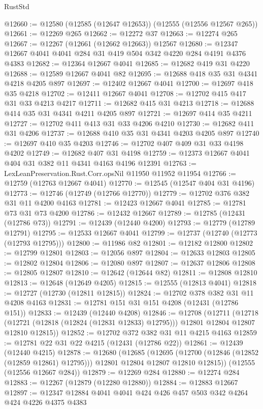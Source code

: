 \begin{lexlean}{RustStd}
\begin{coremodule}
@12660 := @12580 (@12585 (@12647 @12653)) (@12555 (@12556 @12567 @265))
@12661 := @12269 @265
@12662 := @12272 @37
@12663 := @12274 @265
@12667 := @12267 (@12661 (@12662 @12663)) @12567
@12680 := @12347 @12667 @4041 @4041 @284 @31 @419 @504 @342 @4220 @284 @4191 @4376 @4383
@12682 := @12364 @12667 @4041
@12685 := @12682 @419 @31 @4220
@12688 := @12589 @12667 @4041 @82
@12695 := @12688 @418 @35 @31 @4341 @4218 @4205 @897
@12697 := @12402 @12667 @4041
@12700 := @12697 @418 @35 @4218
@12702 := @12411 @12667 @4041
@12708 := @12702 @415 @417 @31 @33 @4213 @4217
@12711 := @12682 @415 @31 @4213
@12718 := @12688 @414 @35 @31 @4341 @4211 @4205 @897
@12721 := @12697 @414 @35 @4211
@12727 := @12702 @411 @413 @31 @33 @4206 @4210
@12730 := @12682 @411 @31 @4206
@12737 := @12688 @410 @35 @31 @4341 @4203 @4205 @897
@12740 := @12697 @410 @35 @4203
@12746 := @12702 @407 @409 @31 @33 @4198 @4202
@12749 := @12682 @407 @31 @4198
@12759 := @12373 @12667 @4041 @404 @31 @382 @11 @4341 @4163 @4196 @12391
@12763 := LexLeanPreservation.Rust.Corr.opsNil @11950 @11952 @11954
@12766 := @12759 (@12763 @12667 @4041)
@12770 := @12545 (@12547 @404 @31 @4196)
@12773 := @12746 (@12749 (@12766 @12770))
@12779 := @12702 @376 @382 @31 @11 @4200 @4163
@12781 := @12423 @12667 @4041
@12785 := @12781 @73 @31 @73 @4200
@12786 := @12432 @12667
@12789 := @12785 (@12431 (@12786 @73))
@12791 := @12439 (@12440 @4200)
@12793 := @12779 (@12789 @12791)
@12795 := @12533 @12667 @4041
@12799 := @12737 (@12740 (@12773 (@12793 @12795)))
@12800 := @11986 @82
@12801 := @12182 @12800
@12802 := @12799 @12801
@12803 := @12056 @897
@12804 := @12633 @12803
@12805 := @12802 @12804
@12806 := @12080 @897
@12807 := @12637 @12806
@12808 := @12805 @12807
@12810 := @12642 (@12644 @82)
@12811 := @12808 @12810
@12813 := @12648 (@12649 @4205)
@12815 := @12555 (@12813 @4041)
@12818 := @12727 (@12730 (@12811 @12815))
@12824 := @12702 @378 @382 @31 @11 @4208 @4163
@12831 := @12781 @151 @31 @151 @4208 (@12431 (@12786 @151))
@12833 := @12439 (@12440 @4208)
@12846 := @12708
    (@12711
      (@12718 (@12721 (@12818 (@12824 (@12831 @12833) @12795))) @12801 @12804 @12807 @12810 @12815))
@12852 := @12702 @372 @382 @31 @11 @4215 @4163
@12859 := @12781 @22 @31 @22 @4215 (@12431 (@12786 @22))
@12861 := @12439 (@12440 @4215)
@12878 := @12680
    (@12685
      (@12695 (@12700 (@12846 (@12852 (@12859 @12861) @12795))) @12801 @12804 @12807 @12810 @12815))
    (@12555 (@12556 @12667 @284))
@12879 := @12269 @284
@12880 := @12274 @284
@12883 := @12267 (@12879 (@12280 @12880))
@12884 := @12883 @12667
@12897 := @12347 @12884 @4041 @4041 @424 @426 @457 @503 @342 @4264 @424 @4226 @4375 @4383

\end{coremodule}
\end{lexlean}
